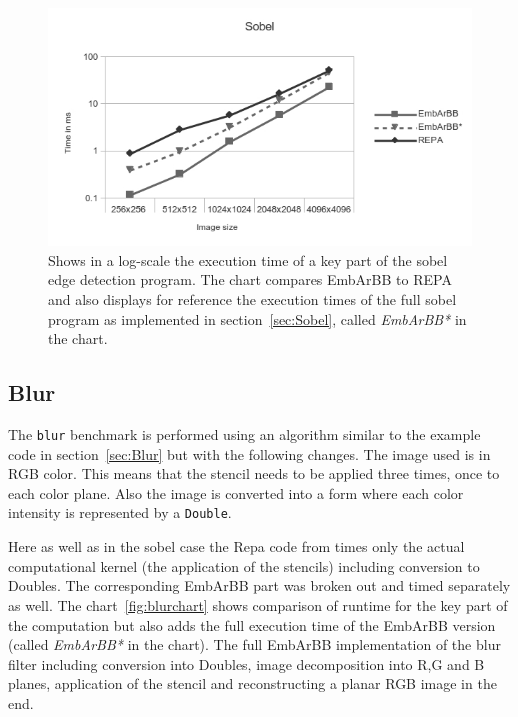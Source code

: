 \begin{figure}
\includegraphics[width=\linewidth]{./embarbb/img/sobelchart1}
\caption{Shows in a log-scale the execution time of a key part of the sobel edge 
         detection program. The chart compares EmbArBB to REPA and also displays 
         for reference the execution times of the full sobel program as implemented 
         in section~\ref{sec:Sobel}, called {\em EmbArBB*} in the chart.}
\label{fig:sobelchart1}
\end{figure}

\subsection{Blur}

The {\tt blur} benchmark is performed using an algorithm similar to the example 
code in section~\ref{sec:Blur} but with the following changes. The image used
is in RGB color. This means that the stencil needs to be applied three times, 
once to each color plane. Also the image is converted into a form 
where each color intensity is represented by a {\tt Double}. 

Here as well as in the sobel case the Repa code from 
times only the actual computational kernel (the application of the stencils) 
including conversion to Doubles. The corresponding EmbArBB part was broken 
out and timed separately as well. The chart~\ref{fig:blurchart} shows comparison
of runtime for the key part of the computation but also adds the full execution 
time of the EmbArBB version (called {\em EmbArBB*} in the chart). 
The full EmbArBB implementation of the blur filter including conversion into Doubles, 
image decomposition into R,G and B planes,  application of the stencil and
reconstructing a planar RGB image in the end.

